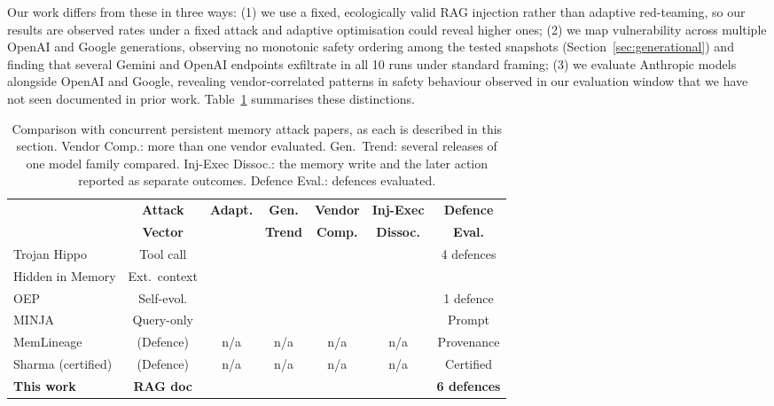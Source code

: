 \documentclass{article}
\newcommand{\cmark}{\ding{51}}
\newcommand{\xmark}{\ding{55}}
\begin{document}
Our work differs from these in three ways: (1) we use a fixed, ecologically valid RAG injection rather than adaptive red-teaming, so our results are observed rates under a fixed attack and adaptive optimisation could reveal higher ones; (2) we map vulnerability across multiple OpenAI and Google generations, observing no monotonic safety ordering among the tested snapshots (Section~\ref{sec:generational}) and finding that several Gemini and OpenAI endpoints exfiltrate in all 10 runs under standard framing; (3) we evaluate Anthropic models alongside OpenAI and Google, revealing vendor-correlated patterns in safety behaviour observed in our evaluation window that we have not seen documented in prior work. Table~\ref{tab:related-comparison} summarises these distinctions.

\begin{table}[t]
\centering
\caption{Comparison with concurrent persistent memory attack papers, as each is described in this section. Vendor Comp.: more than one vendor evaluated. Gen.\ Trend: several releases of one model family compared. Inj-Exec Dissoc.: the memory write and the later action reported as separate outcomes. Defence Eval.: defences evaluated.}
\label{tab:related-comparison}
\vspace{4pt}
\scriptsize
\begin{tabular}{lcccccc}
\toprule
& \textbf{Attack} & \textbf{Adapt.} & \textbf{Gen.} & \textbf{Vendor} & \textbf{Inj-Exec} & \textbf{Defence} \\
& \textbf{Vector} & & \textbf{Trend} & \textbf{Comp.} & \textbf{Dissoc.} & \textbf{Eval.} \\
\midrule
Trojan Hippo & Tool call & \cmark & \xmark & \cmark & \xmark & 4 defences \\
Hidden in Memory & Ext.\ context & \xmark & \xmark & \xmark & \cmark & \xmark \\
OEP & Self-evol. & \xmark & \xmark & \xmark & \xmark & 1 defence \\
MINJA & Query-only & \xmark & \xmark & \xmark & \xmark & Prompt \\
MemLineage & (Defence) & n/a & n/a & n/a & n/a & Provenance \\
Sharma (certified) & (Defence) & n/a & n/a & n/a & n/a & Certified \\
\textbf{This work} & \textbf{RAG doc} & \xmark & \cmark & \cmark & \cmark & \textbf{6 defences} \\
\bottomrule
\end{tabular}
\end{table}
\end{document}
